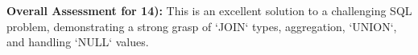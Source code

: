 \documentclass{article}
\begin{document}
\begin{enumerate}[label=\textbf{Question \arabic*.}]
\begin{itemize}
        \textbf{Overall Assessment for 14):} This is an excellent solution to a challenging SQL problem, demonstrating a strong grasp of `JOIN` types, aggregation, `UNION`, and handling `NULL` values.
    \end{itemize}

\end{enumerate}
\end{document}
